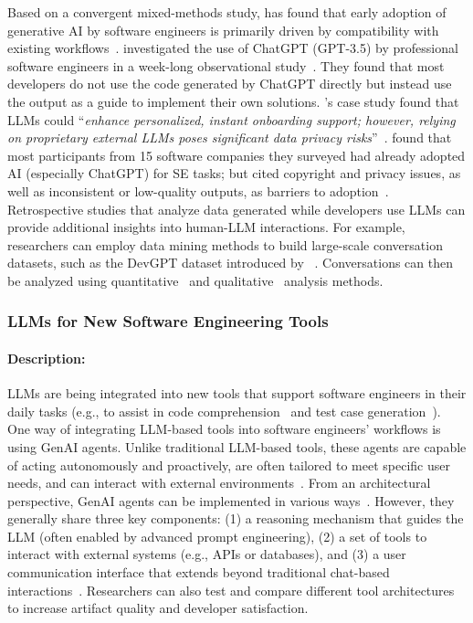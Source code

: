 \documentclass[smallextended]{svjour3}
\newcommand*{\enq}[1]{\enquote{{\itshape#1}}}
\newcommand{\studytypesubsection}[1]{\subsubsection{#1}}
\newcommand{\studytypeparagraph}[1]{\paragraph{\bfseries #1:}}
\newcommand{\studytypesubsection}[1]{\subsection{#1}}
\newcommand{\studytypeparagraph}[1]{\subsubsection{#1}}
\begin{document}
Based on a convergent mixed-methods study, \citeauthor{DBLP:journals/tosem/Russo24} has found that early adoption of generative AI by software engineers is primarily driven by compatibility with existing workflows~\cite{DBLP:journals/tosem/Russo24}.
\citeauthor{DBLP:journals/pacmse/KhojahM0N24} investigated the use of ChatGPT (GPT-3.5) by professional software engineers in a week-long observational study~\cite{DBLP:journals/pacmse/KhojahM0N24}.
They found that most developers do not use the code generated by ChatGPT directly but instead use the output as a guide to implement their own solutions.
\citeauthor{DBLP:conf/csee/AzanzaPIG24}'s case study found that LLMs could \enq{enhance personalized, instant onboarding support; however, relying on proprietary external LLMs poses significant data privacy risks}~\cite{DBLP:conf/csee/AzanzaPIG24}. 
 \citeauthor{DBLP:conf/icsa/JahicS24} found that most participants from 15 software companies they surveyed had already adopted AI (especially ChatGPT) for SE tasks; but cited copyright and privacy issues, as well as inconsistent or low-quality outputs, as barriers to adoption~\cite{DBLP:conf/icsa/JahicS24}. 
Retrospective studies that analyze data generated while developers use LLMs can provide additional insights into human-LLM interactions.
For example, researchers can employ data mining methods to build large-scale conversation datasets, such as the DevGPT dataset introduced by \citeauthor{DBLP:conf/msr/XiaoTHM24}~\cite{DBLP:conf/msr/XiaoTHM24}.
Conversations can then be analyzed using quantitative~\cite{DBLP:conf/msr/RabbiCZI24} and qualitative~\cite{DBLP:conf/msr/MohamedPP24} analysis methods.
 
\studytypesubsection{LLMs for New Software Engineering Tools}
\label{sec:llms-for-new-software-engineering-tools}

\studytypeparagraph{Description}

LLMs are being integrated into new tools that support software engineers in their daily tasks (e.g., to assist in code comprehension~\cite{DBLP:conf/chi/YanHWH24} and test case generation~\cite{DBLP:journals/tse/SchaferNET24}).
One way of integrating LLM-based tools into software engineers' workflows is using GenAI agents.
Unlike traditional LLM-based tools, these agents are capable of acting autonomously and proactively, are often tailored to meet specific user needs, and can interact with external environments~\cite{DBLP:conf/icse-seip/TakerngsaksiriPTTZJLCCW25,wiesinger2025agents,yang2025code}.
From an architectural perspective, GenAI agents can be implemented in various ways~\cite{wiesinger2025agents}.
However, they generally share three key components: (1) a reasoning mechanism that guides the LLM (often enabled by advanced prompt engineering), (2) a set of tools to interact with external systems (e.g., APIs or databases), and (3) a user communication interface that extends beyond traditional chat-based interactions~\cite{DBLP:conf/icsm/RichardsW24, DBLP:journals/tmlr/SumersYN024, DBLP:journals/corr/abs-2309-07870}.
Researchers can also test and compare different tool architectures to increase artifact quality and developer satisfaction.
\end{document}
